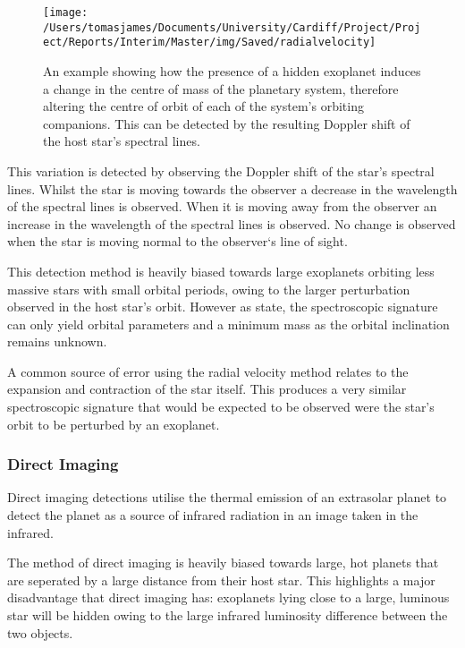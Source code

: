 \documentclass[twoside,4pt]{article}
\begin{document}
\begin{multicols}{2}
\begin{figure}[H]
\centering
    \texttt{[image: /Users/tomasjames/Documents/University/Cardiff/Project/Project/Reports/Interim/Master/img/Saved/radialvelocity]}
\caption[An example showing how the presence of a hidden exoplanet induces a change in the centre of mass of the planetary system, therefore altering the centre of orbit of each of the system's orbiting companions. This can be detected by the resulting Doppler shift of the host star's spectral lines.] {An example showing how the presence of a hidden exoplanet induces a change in the centre of mass of the planetary system, therefore altering the centre of orbit of each of the system's orbiting companions. This can be detected by the resulting Doppler shift of the host star's spectral lines. \parencite{rvdetect}}\label{rvdetect}
\end{figure}

This variation is detected by observing the Doppler shift of the star’s spectral lines. Whilst the star is moving towards the observer a decrease in the wavelength of the spectral lines is observed. When it is moving away from the observer an increase in the wavelength of the spectral lines is observed. No change is observed when the star is moving normal to the observer`s line of sight. 

This detection method is heavily biased towards large exoplanets orbiting less massive stars with small orbital periods, owing to the larger perturbation observed in the host star’s orbit. However as \textcite{stats} state, the spectroscopic signature can only yield orbital parameters and a minimum mass as the orbital inclination remains unknown. 

A common source of error using the radial velocity method relates to the expansion and contraction of the star itself. This produces a very similar spectroscopic signature that would be expected to be observed were the star's orbit to be perturbed by an exoplanet.

\subsubsection{Direct Imaging }
Direct imaging detections utilise the thermal emission of an extrasolar planet to detect the planet as a source of infrared radiation in an image taken in the infrared. 

The method of direct imaging is heavily biased towards large, hot planets that are seperated by a large distance from their host star. This highlights a major disadvantage that direct imaging has: exoplanets lying close to a large, luminous star will be hidden owing to the large infrared luminosity difference between the two objects.   


\end{multicols}
\end{document}
